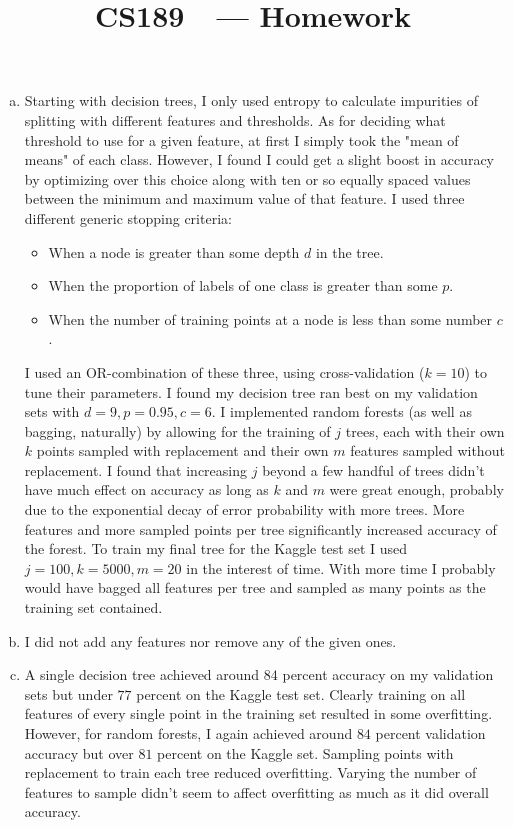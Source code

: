 \documentclass[11pt]{article}
\title{CS189\ \Session\  --- Homework \Homework}
\author{\Name}
\newcommand{\asdf}{\newline\newline}
\begin{document}
\maketitle

\begin{enumerate}[(a)]
\item Starting with decision trees, I only used entropy to calculate impurities of splitting with different features and thresholds. As for deciding what threshold to use for a given feature, at first I simply took the "mean of means" of each class. However, I found I could get a slight boost in accuracy by optimizing over this choice along with ten or so equally spaced values between the minimum and maximum value of that feature.\asdf
I used three different generic stopping criteria:
\begin{itemize}
\item When a node is greater than some depth $d$ in the tree.
\item When the proportion of labels of one class is greater than some $p$.
\item When the number of training points at a node is less than some number $c$.
\end{itemize}
I used an OR-combination of these three, using cross-validation ($k=10$) to tune their parameters. I found my decision tree ran best on my validation sets with $d=9,p=0.95,c=6$.\asdf
I implemented random forests (as well as bagging, naturally) by allowing for the training of $j$ trees, each with their own $k$ points sampled with replacement and their own $m$ features sampled without replacement.\asdf
I found that increasing $j$ beyond a few handful of trees didn't have much effect on accuracy as long as $k$ and $m$ were great enough, probably due to the exponential decay of error probability with more trees. More features and more sampled points per tree significantly increased accuracy of the forest. To train my final tree for the Kaggle test set I used $j=100,k=5000,m=20$ in the interest of time. With more time I probably would have bagged all features per tree and sampled as many points as the training set contained.
\item I did not add any features nor remove any of the given ones.
\item A single decision tree achieved around $84$ percent accuracy on my validation sets but under $77$ percent on the Kaggle test set. Clearly training on all features of every single point in the training set resulted in some overfitting.\asdf
However, for random forests, I again achieved around $84$ percent validation accuracy but over $81$ percent on the Kaggle set. Sampling points with replacement to train each tree reduced overfitting. Varying the number of features to sample didn't seem to affect overfitting as much as it did overall accuracy.

\end{enumerate}
\end{document}
